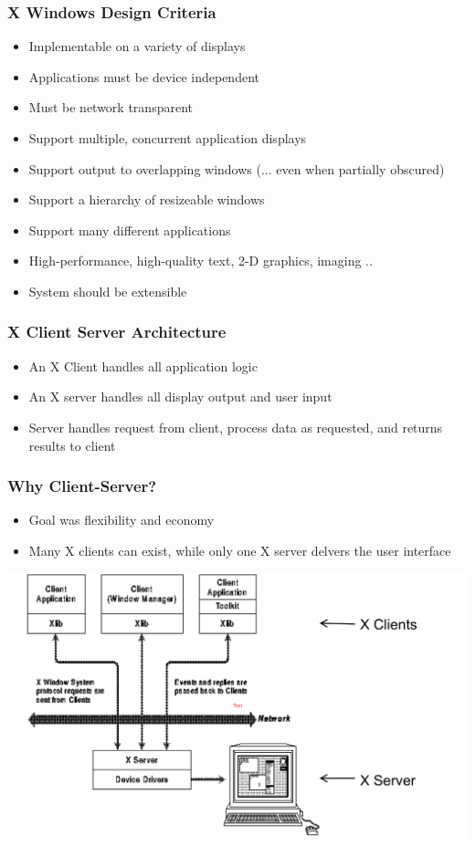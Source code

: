 \documentclass[twoside]{article}
\begin{document}
\subsubsection{X Windows Design Criteria}
\begin{itemize}
\item Implementable on a variety of displays
\item Applications must be device independent
\item Must be network transparent
\item Support multiple, concurrent application displays
\item Support output to overlapping windows (... even when partially obscured)
\item Support a hierarchy of resizeable windows
\item Support many different applications
\item High-performance, high-quality text, 2-D graphics, imaging .. 
\item System should be extensible
\end{itemize}

\subsubsection{X Client Server Architecture}
\begin{itemize}
\item An X Client handles all application logic 
\item An X server handles all display output and user input
\item Server handles request from client, process data as requested, and returns results to client
\end{itemize}

\subsubsection{Why Client-Server?}
\begin{itemize}
\item Goal was flexibility and economy 
\item Many X clients can exist, while only one X server delvers the user interface 
\end{itemize}

\begin{center}
\includegraphics[scale=0.3]{1}
\end{center}
\newpage
\end{document}
